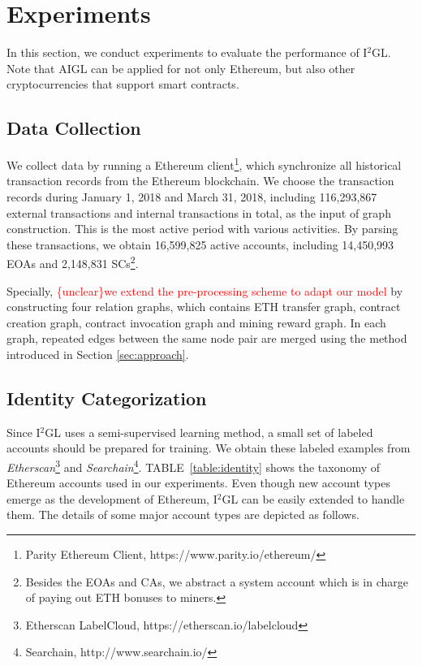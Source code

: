 
\section{Experiments}
\label{sec:experiments}
In this section, we conduct experiments to evaluate the performance of I$^2$GL. Note that AIGL can be applied for not only Ethereum, but also other cryptocurrencies that support smart contracts.

\subsection{Data Collection}
We collect data by running a  Ethereum client\footnote{Parity Ethereum Client, https://www.parity.io/ethereum/}, which synchronize all historical transaction records from the Ethereum blockchain. We choose the transaction records during January 1, 2018 and March 31, 2018, including 116,293,867 external transactions and internal transactions in total, as the input of graph construction. This is the most active period with various activities. By parsing these transactions, we obtain 16,599,825 active accounts, including 14,450,993 EOAs and 2,148,831 SCs\footnote{Besides the EOAs and CAs, we abstract a system account which is in charge of paying out ETH bonuses to miners.}.

Specially, \textcolor{red}{\{unclear\}we extend the pre-processing scheme to adapt our model} by constructing four relation graphs, which contains ETH transfer graph, contract creation graph, contract invocation graph and mining reward graph. In each graph, repeated edges between the same node pair are merged using the method introduced in Section \ref{sec:approach}.


\subsection{Identity Categorization}
Since I$^2$GL uses a semi-supervised learning method, a small set of labeled accounts should be prepared for training. We obtain these labeled examples from \emph{Etherscan}\footnote{Etherscan LabelCloud, https://etherscan.io/labelcloud} and \emph{Searchain}\footnote{Searchain, http://www.searchain.io/}. TABLE~\ref{table:identity} shows the taxonomy of Ethereum accounts used in our experiments. Even though new account types emerge as the development of Ethereum, I$^2$GL can be easily extended to handle them. The details of some major account types are depicted as follows.


